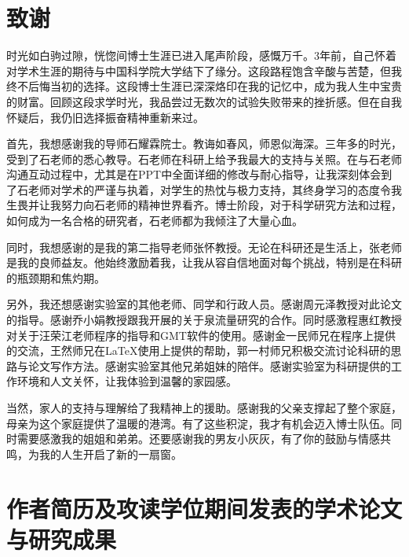 \chapter[致谢]{致\quad 谢}

时光如白驹过隙，恍惚间博士生涯已进入尾声阶段，感慨万千。3年前，自己怀着对学术生涯的期待与中国科学院大学结下了缘分。这段路程饱含辛酸与苦楚，但我终不后悔当初的选择。这段博士生涯已深深烙印在我的记忆中，成为我人生中宝贵的财富。回顾这段求学时光，我品尝过无数次的试验失败带来的挫折感。但在自我怀疑后，我仍旧选择振奋精神重新来过。

首先，我想感谢我的导师石耀霖院士。教诲如春风，师恩似海深。三年多的时光，受到了石老师的悉心教导。石老师在科研上给予我最大的支持与关照。在与石老师沟通互动过程中，尤其是在PPT中全面详细的修改与耐心指导，让我深刻体会到了石老师对学术的严谨与执着，对学生的热忱与极力支持，其终身学习的态度令我生畏并让我努力向石老师的精神世界看齐。博士阶段，对于科学研究方法和过程，如何成为一名合格的研究者，石老师都为我倾注了大量心血。

同时，我想感谢的是我的第二指导老师张怀教授。无论在科研还是生活上，张老师是我的良师益友。他始终激励着我，让我从容自信地面对每个挑战，特别是在科研的瓶颈期和焦灼期。

另外，我还想感谢实验室的其他老师、同学和行政人员。感谢周元泽教授对此论文的指导。感谢乔小娟教授跟我开展的关于泉流量研究的合作。同时感激程惠红教授对关于汪荣江老师程序的指导和GMT软件的使用。感谢金一民师兄在程序上提供的交流，王然师兄在\LaTeX{}使用上提供的帮助，郭一村师兄积极交流讨论科研的思路与论文写作方法。感谢实验室其他兄弟姐妹的陪伴。感谢实验室为科研提供的工作环境和人文关怀，让我体验到温馨的家园感。

当然，家人的支持与理解给了我精神上的援助。感谢我的父亲支撑起了整个家庭，母亲为这个家庭提供了温暖的港湾。有了这些积淀，我才有机会迈入博士队伍。同时需要感激我的姐姐和弟弟。还要感谢我的男友小灰灰，有了你的鼓励与情感共鸣，为我的人生开启了新的一扇窗。


\chapter{作者简历及攻读学位期间发表的学术论文与研究成果}


